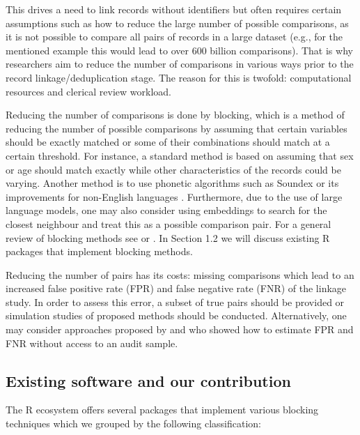 This drives a need to link records without identifiers but often
requires certain assumptions such as how to reduce the large number of
possible comparisons, as it is not possible to compare all pairs of
records in a large dataset (e.g., for the mentioned example this would
lead to over 600 billion comparisons). That is why researchers aim to
reduce the number of comparisons in various ways prior to the record
linkage/deduplication stage. The reason for this is twofold:
computational resources and clerical review workload.

Reducing the number of comparisons is done by blocking, which is a
method of reducing the number of possible comparisons by assuming that
certain variables should be exactly matched or some of their
combinations should match at a certain threshold. For instance, a standard
method is based on assuming that sex or age should match exactly while
other characteristics of the records could be varying. Another method is
to use phonetic algorithms such as Soundex \citep[cf.][]{Wright1960} or its
improvements for non-English languages \citep[cf.][]{Phonetic2020}. Furthermore,
due to the use of large language models, one may also consider using
embeddings \citep{mikolov2013efficient} to search for the closest neighbour
and treat this as a possible comparison pair. For a general review of blocking
methods see \citet{Steorts2014} or \citet{Papadakis2020}. In Section
1.2 we will discuss existing R packages that implement
blocking methods.

Reducing the number of pairs has its costs: missing comparisons which
lead to an increased false positive rate (FPR) and false negative rate
(FNR) of the linkage study. In order to assess this error, a subset of
true pairs should be provided or simulation studies of proposed methods
should be conducted. Alternatively, one may consider approaches proposed
by \citet{dasylva2021estimating} and \citet{dasylva2022consistent} who showed how to
estimate FPR and FNR without access to an audit sample.

\subsection{Existing software and our contribution}\label{sec-software}

The R ecosystem offers several packages that implement various blocking
techniques which we grouped by the following classification:

